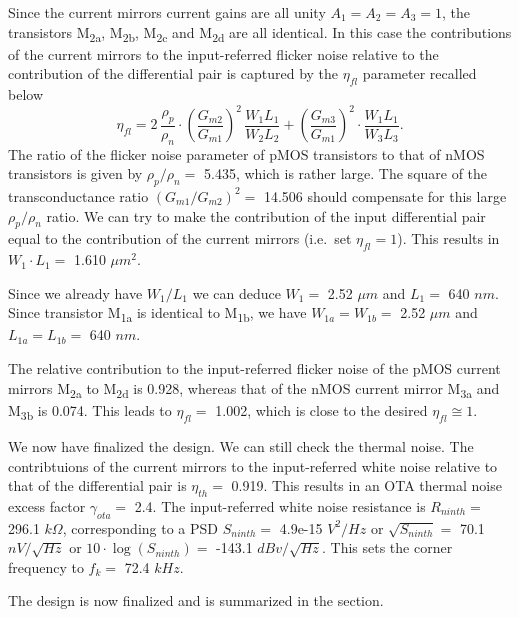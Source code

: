 \documentclass[
  a4paper,
  DIV=11,
  numbers=noendperiod]{scrreprt}
\begin{document}
Since the current mirrors current gains are all unity \(A_1=A_2=A_3=1\),
the transistors M\textsubscript{2a}, M\textsubscript{2b},
M\textsubscript{2c} and M\textsubscript{2d} are all identical. In this
case the contributions of the current mirrors to the input-referred
flicker noise relative to the contribution of the differential pair is
captured by the \(\eta_{fl}\) parameter recalled below \begin{equation}
  \eta_{fl} = 2\,\frac{\rho_p}{\rho_n} \cdot \left(\frac{G_{m2}}{G_{m1}}\right)^2\,\frac{W_1 L_1}{W_2 L_2} + \left(\frac{G_{m3}}{G_{m1}}\right)^2 \cdot \frac{W_1 L_1}{W_3 L_3}.
\end{equation} The ratio of the flicker noise parameter of pMOS
transistors to that of nMOS transistors is given by \(\rho_p/\rho_n =\)
5.435, which is rather large. The square of the transconductance ratio
\((G_{m1}/G_{m2})^2 =\) 14.506 should compensate for this large
\(\rho_p/\rho_n\) ratio. We can try to make the contribution of the
input differential pair equal to the contribution of the current mirrors
(i.e.~set \(\eta_{fl}=1\)). This results in \(W_1 \cdot L_1 =\) 1.610
\(\mu m^2\).

Since we already have \(W_1/L_1\) we can deduce \(W_1 =\) 2.52 \(\mu m\)
and \(L_1 =\) 640 \(nm\). Since transistor M\textsubscript{1a} is
identical to M\textsubscript{1b}, we have \(W_{1a} = W_{1b} =\) 2.52
\(\mu m\) and \(L_{1a} = L_{1b} =\) 640 \(nm\).

The relative contribution to the input-referred flicker noise of the
pMOS current mirrors M\textsubscript{2a} to M\textsubscript{2d} is
0.928, whereas that of the nMOS current mirror M\textsubscript{3a} and
M\textsubscript{3b} is 0.074. This leads to \(\eta_{fl} =\) 1.002, which
is close to the desired \(\eta_{fl} \cong 1\).

We now have finalized the design. We can still check the thermal noise.
The contribtuions of the current mirrors to the input-referred white
noise relative to that of the differential pair is \(\eta_{th} =\)
0.919. This results in an OTA thermal noise excess factor
\(\gamma_{ota} =\) 2.4. The input-referred white noise resistance is
\(R_{ninth} =\) 296.1 \(k\Omega\), corresponding to a PSD
\(S_{ninth} =\) 4.9e-15 \(V^2/Hz\) or \(\sqrt{S_{ninth}} =\) 70.1
\(nV/\sqrt{Hz}\) or \(10 \cdot \log(S_{ninth}) =\) -143.1
\(dBv/\sqrt{Hz}\). This sets the corner frequency to \(f_k =\) 72.4
\(kHz\).

The design is now finalized and is summarized in the section.
\end{document}
